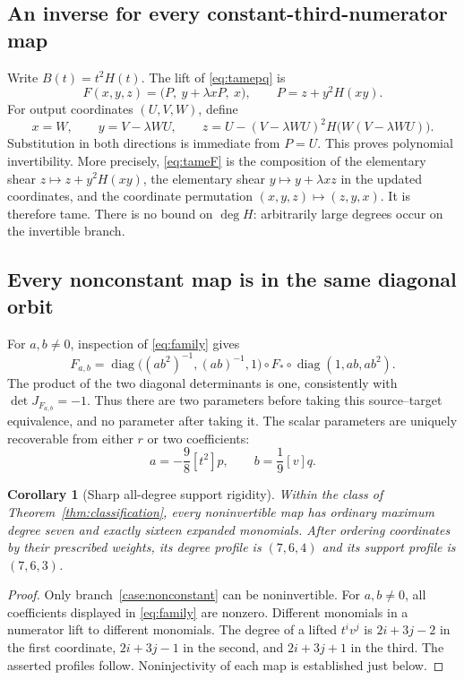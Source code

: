 \documentclass[11pt,a4paper]{article}
\numberwithin{equation}{section}
\newtheorem{corollary}[theorem]{Corollary}
\theoremstyle{definition}
\theoremstyle{remark}
\newcommand{\diag}{\operatorname{diag}}
\newcommand{\coeff}[2]{[#1]#2}
\begin{document}
\subsection{An inverse for every constant-third-numerator map}

Write $B(t)=t^2H(t)$. The lift of \eqref{eq:tamepq} is
\begin{equation}\label{eq:tameF}
F(x,y,z)=\bigl(P,\ y+\lambda xP,\ x\bigr),\qquad
P=z+y^2H(xy).
\end{equation}
For output coordinates $(U,V,W)$, define
\begin{equation}\label{eq:tameinverse}
 x=W,\qquad y=V-\lambda WU,\qquad
 z=U-(V-\lambda WU)^2H\bigl(W(V-\lambda WU)\bigr).
\end{equation}
Substitution in both directions is immediate from $P=U$. This proves
polynomial invertibility. More precisely, \eqref{eq:tameF} is the
composition of the elementary shear
$z\mapsto z+y^2H(xy)$, the elementary shear $y\mapsto y+\lambda xz$ in the
updated coordinates, and the coordinate permutation
$(x,y,z)\mapsto(z,y,x)$. It is therefore tame. There is no bound on
$\deg H$: arbitrarily large degrees occur on the invertible branch.

\subsection{Every nonconstant map is in the same diagonal orbit}

For $a,b\ne0$, inspection of \eqref{eq:family} gives
\begin{equation}\label{eq:diagonal}
F_{a,b}=\diag\bigl((ab^2)^{-1},(ab)^{-1},1\bigr)
\circ F_*\circ\diag(1,ab,ab^2).
\end{equation}
The product of the two diagonal determinants is one, consistently with
$\det J_{F_{a,b}}=-1$. Thus there are two parameters before taking this
source--target equivalence, and no parameter after taking it. The scalar
parameters are uniquely recoverable from either $r$ or two coefficients:
\begin{equation}\label{eq:coeffrecover}
a=-\frac98\coeff{t^2}{p},\qquad
b=\frac19\coeff{v}{q}.
\end{equation}

\begin{corollary}[Sharp all-degree support rigidity]\label{cor:support}
Within the class of Theorem~\ref{thm:classification}, every noninvertible
map has ordinary maximum degree seven and exactly sixteen expanded
monomials. After ordering coordinates by their prescribed weights, its
degree profile is $(7,6,4)$ and its support profile is $(7,6,3)$.
\end{corollary}
\begin{proof}
Only branch~\ref{case:nonconstant} can be noninvertible. For $a,b\ne0$,
all coefficients displayed in \eqref{eq:family} are nonzero. Different
monomials in a numerator lift to different monomials. The degree of a lifted
$t^iv^j$ is $2i+3j-2$ in the first coordinate, $2i+3j-1$ in the second,
and $2i+3j+1$ in the third. The asserted profiles follow. Noninjectivity of
each map is established just below.
\end{proof}
\end{document}
